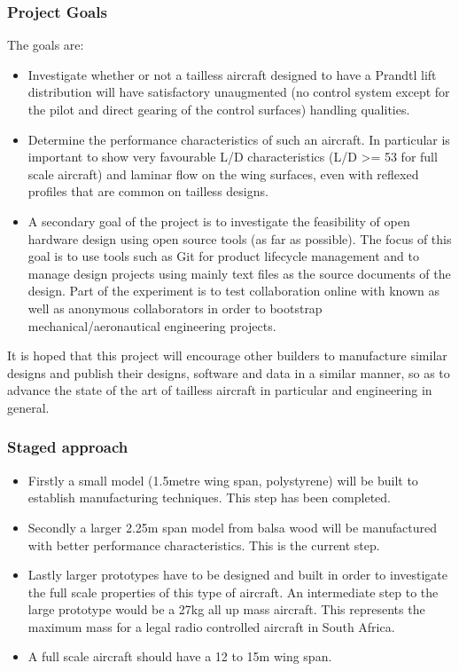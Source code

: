 \documentclass{beamer}
\begin{document}
\begin{frame}
\frametitle{Project Goals}

The goals are:

\begin{itemize}
\item Investigate whether or not a tailless aircraft designed to have a Prandtl lift distribution will have satisfactory unaugmented (no control system except for the pilot and direct gearing of the control surfaces) handling qualities.
\item Determine the performance characteristics of such an aircraft.  In particular is important to show very favourable L/D characteristics (L/D >= 53 for full scale aircraft) and laminar flow on the wing surfaces, even with reflexed profiles that are common on tailless designs.
\item A secondary goal of the project is to investigate the feasibility of open hardware design using open source tools (as far as possible).  The focus of this goal is to use tools such as Git for product lifecycle management and to manage design projects using mainly text files as the source documents of the design.  Part of the experiment is to test collaboration online with known as well as anonymous collaborators in order to bootstrap mechanical/aeronautical engineering projects.
\end{itemize}

It is hoped that this project will encourage other builders to manufacture similar designs and publish their designs, software and 
data in a similar manner, so as to advance the state of the art of tailless aircraft in particular and engineering in general.

\end{frame}

\begin{frame}
\frametitle{Staged approach}

\begin{itemize}
\item Firstly a small model (1.5metre wing span, polystyrene) will be built to establish manufacturing techniques.  This step has been completed.
\item Secondly a larger 2.25m span model from balsa wood will be manufactured with better performance characteristics.  This is the current step.
\item Lastly larger prototypes have to be designed and built in order to investigate the full scale properties of this type of aircraft.  An intermediate step to the large prototype would be a 27kg all up mass aircraft.  This represents the maximum mass for a legal radio controlled aircraft in South Africa.
\item A full scale aircraft should have a 12 to 15m wing span.  
\end{itemize}

\end{frame}
\end{document}
